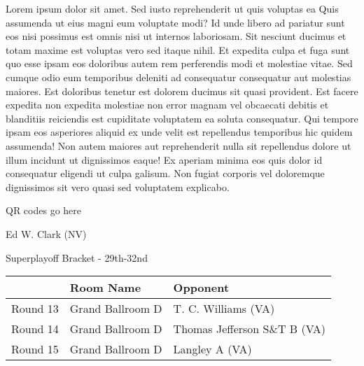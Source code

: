 \documentclass{article}%
\begin{document}
\vspace*{8pt}%
\linebreak%
\newline%
\newline%
Lorem ipsum dolor sit amet. Sed iusto reprehenderit ut quis voluptas ea Quis assumenda ut eius magni eum voluptate modi? Id unde libero ad pariatur sunt eos nisi possimus est omnis nisi ut internos laboriosam. Sit nesciunt ducimus et totam maxime est voluptas vero sed itaque nihil. Et expedita culpa et fuga sunt quo esse ipsam eos doloribus autem rem perferendis modi et molestiae vitae.\newline%
\newline%
Sed cumque odio eum temporibus deleniti ad consequatur consequatur aut molestias maiores. Est doloribus tenetur est dolorem ducimus sit quasi provident. Est facere expedita non expedita molestiae non error magnam vel obcaecati debitis et blanditiis reiciendis est cupiditate voluptatem ea soluta consequatur. Qui tempore ipsam eos asperiores aliquid ex unde velit est repellendus temporibus hic quidem assumenda!\newline%
\newline%
Non autem maiores aut reprehenderit nulla sit repellendus dolore ut illum incidunt ut dignissimos eaque! Ex aperiam minima eos quis dolor id consequatur eligendi ut culpa galisum. Non fugiat corporis vel doloremque dignissimos sit vero quasi sed voluptatem explicabo.\newline%
\newline%
%
\vspace*{30pt}%
\begin{center}%
\begin{Huge}%
QR codes go here%
\end{Huge}%
\end{center}%
\newpage%
\begin{center}%
\begin{Huge}%
Ed W. Clark (NV)%
\end{Huge}%
\vspace*{8pt}%
\linebreak%
\begin{Large}%
Superplayoff Bracket {-} 29th{-}32nd%
\end{Large}%
\end{center}%
%
\begin{tabularx}{\textwidth}{|c|Y|Y|}%
\hline%
&Room Name&Opponent\\%
\hline%
Round 13&Grand Ballroom D&T. C. Williams (VA)\\%
Round 14&Grand Ballroom D&Thomas Jefferson S\&T B (VA)\\%
Round 15&Grand Ballroom D&Langley A (VA)\\%
\hline%
\end{tabularx}%
\end{document}
